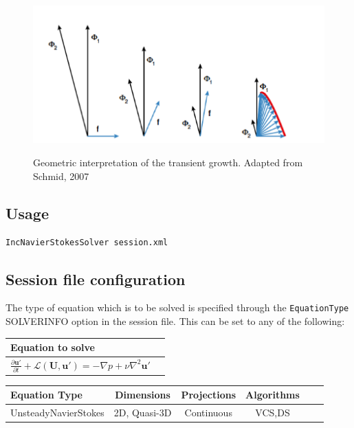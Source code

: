 \begin{figure}[!htbp]
\centering
 \label{TG}
 {\includegraphics[width=1 \textwidth]{Figures/transient_growth.png}}
   \caption {Geometric interpretation of the transient growth. Adapted from Schmid, 2007 }
\end{figure}

\subsection{Usage}

\texttt {IncNavierStokesSolver session.xml}

\subsection{Session file configuration}

 The type of equation which is to be solved is specified through the \texttt {EquationType} SOLVERINFO option in the session file. This can be set to any of the following: 

\begin{table}
\begin{center}
\begin{tabular}{|l|c|} \hline
{Equation to solve}  \\ \hline
$\frac{\partial\mathbf{u'}}{\partial t} +\mathcal{L}(\mathbf{U},\mathbf{u'})=-\nabla p+\nu \nabla^2 \mathbf{u'}$\\ \hline
\end{tabular}
\end{center}
\end{table}


\begin{table}
\begin{center}
\begin{tabular}{|l|c|c|c|c|c|} \hline
{Equation Type} & {Dimensions} &{Projections} &{Algorithms} \\ \hline
UnsteadyNavierStokes & 2D, Quasi-3D& Continuous &VCS,DS\\ \hline
\end{tabular}
\end{center}
\end{table}

